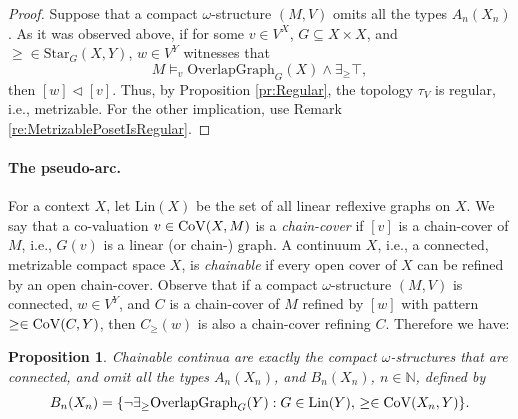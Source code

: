 \documentclass[12pt]{amsart}
\theoremstyle{plain}
\newtheorem{proposition}[theorem]{\bf Proposition}
\newcommand \Val{{\rm{CoV}}}
\newcommand \Sp{{\mathsf{S}}}
\newcommand \NN{\mathbb{N}}
\newcommand \PPb{\mathbb{P}}
\begin{document}
\begin{proof}
	Suppose that a compact $\omega$-structure $(M,V)$ omits all the types $A_n(X_n)$. %
	As it was observed above, if for some $v \in V^X$, $G \subseteq X \times X$,  and $\geq \in \mbox{Star}_G(X,Y)$, $w \in V^Y$ witnesses that $$M \models_v \mbox{OverlapGraph}_{G}(X) \wedge  \exists_{\geq} \top,$$ then $[w] \lhd [v]$. Thus, by Proposition \ref{pr:Regular}, the topology $\tau_V$ is regular, i.e., metrizable.
	 For the other implication, use Remark \ref{re:MetrizablePosetIsRegular}.
	
\end{proof}

\paragraph{\textbf{The pseudo-arc}.} 
%
For a context $X$, let $\mbox{Lin}(X)$ be the set of all linear reflexive graphs on $X$. We say that a co-valuation $v \in \Val(X,M)$ is a \emph{chain-cover} if $[v]$ is a chain-cover of $M$, i.e., $G(v)$ is a linear (or chain-) graph. A continuum $X$, i.e., a connected, metrizable  compact space $X$, is \emph{chainable} if every  open cover of $X$ can be refined by an open chain-cover. Observe that if a compact $\omega$-structure $(M,V)$ is connected, $w \in V^Y$, and $C$ is a chain-cover of $M$ refined by $[w]$ with pattern $\geq \in \Val(C,Y)$, then $C_{\geq}(w)$ is also a chain-cover refining $C$.  Therefore we have:

\begin{proposition}
	Chainable continua are exactly the compact $\omega$-structures that are connected, and omit all the types $A_n(X_n)$, and $B_n(X_n)$,  $n \in \NN$, defined by	
	\[ B_n(X_n)=\{ \neg \exists_{\geq} \text{OverlapGraph}_G(Y): G \in \mbox{Lin}(Y), \, \geq \in \Val(X_n,Y) \}.\]
\end{proposition}
\end{document}
